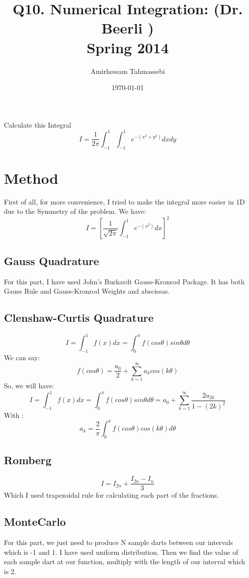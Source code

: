 \documentclass[a4paper]{article}
\title{Q10. Numerical Integration: (Dr. Beerli )\\Spring 2014}
\author{Amirhessam Tahmassebi}
\date{\today}
\begin{document}
\maketitle

Calculate this Integral
$$ I = \frac{1}{2\pi}\int_{-1}^{1}\int_{-1}^{1} e^{-(x^2+y^2)}dxdy$$ 

\section*{Method}
First of all, for more convenience, I tried to make the integral more easier in 1D due to the Symmetry of the problem. We have: \\

$$ I = [\frac{1}{\sqrt{2 \pi }}\int_{-1}^{1} e^{-(x^2)}dx]^2$$ 

\subsection*{Gauss Quadrature}
For this part, I have used John's Burkardt Gauss-Kronrod Package. It has both Gauss Rule and Gauss-Kronrod Weights and abscissas.

\subsection*{Clenshaw-Curtis Quadrature}


$$ I = \int_{-1}^{1} f(x) dx = \int_{0}^{\pi}f(cos\theta)sin\theta d\theta$$ 
We can say: \\
$$f(cos\theta) = \frac{a_0}{2} + \sum_{k=1}^{\infty} a_kcos(k\theta)$$
So, we will have: \\
$$ I = \int_{-1}^{1} f(x) dx = \int_{0}^{\pi}f(cos\theta)sin\theta d\theta = a_0 +\sum_{k=1}^{\infty} \frac{2a_{2k}}{1-(2k)^2} $$ 
With : \\
$$a_k = \frac{2}{\pi} \int_{0}^{\pi} f(cos\theta)cos(k\theta)d\theta$$


\subsection*{Romberg}
$$ I = I_{2n} + \frac{I_{2n}-I_{n}}{3}$$
Which I used trapezoidal rule for calculating each part of the fractions.

\subsection*{MonteCarlo}

For this part, we just need to produce N sample darts between our intervals which is -1 and 1. I have used uniform distribution. Then we find the value of each sample dart at our function, multiply with the length of our interval which is 2.
\end{document}
